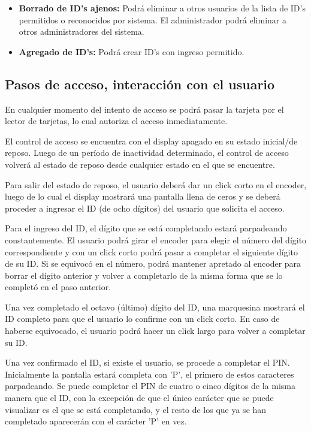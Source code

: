\documentclass[10pt,a4paper]{article}
\begin{document}
\begin{itemize}
\item \textbf{Borrado de ID's ajenos: } Podrá eliminar a otros usuarios de la lista de ID's permitidos o reconocidos por sistema. El administrador podrá eliminar a otros administradores del sistema.
\item \textbf{Agregado de ID's: } Podrá crear ID's con ingreso permitido.

\end{itemize}

\subsection{Pasos de acceso, interacción con el usuario}
En cualquier momento del intento de acceso se podrá pasar la tarjeta por el lector de tarjetas, lo cual autoriza el acceso inmediatamente.\par
El control de acceso se encuentra con el display apagado en su estado inicial/de reposo. Luego de un período de inactividad determinado, el control de acceso volverá al estado de reposo desde cualquier estado en el que se encuentre.\par
Para salir del estado de reposo, el usuario deberá dar un click corto en el encoder, luego de lo cual el display mostrará una pantalla llena de ceros y se deberá proceder a ingresar el ID (de ocho dígitos) del usuario que solicita el acceso. \par
Para el ingreso del ID, el dígito que se está completando estará parpadeando constantemente. El usuario podrá girar el encoder para elegir el número del dígito correspondiente y con un click corto podrá pasar a completar el siguiente dígito de su ID. Si se equivocó en el número, podrá mantener apretado al encoder para borrar el dígito anterior y volver a completarlo de la misma forma que se lo completó en el paso anterior. \par
Una vez completado el octavo (último) dígito del ID, una marquesina mostrará el ID completo para que el usuario lo confirme con un click corto. En caso de haberse equivocado, el usuario podrá hacer un click largo para volver a completar su ID.\par
Una vez confirmado el ID, si existe el usuario, se procede a completar el PIN. Inicialmente la pantalla estará completa con 'P', el primero de estos caracteres parpadeando. Se puede completar el PIN de cuatro o cinco dígitos de la misma manera que el ID, con la excepción de que el único carácter que se puede visualizar es el que se está completando, y el resto de los que ya se han completado aparecerán con el carácter 'P' en vez. \par
\end{document}
